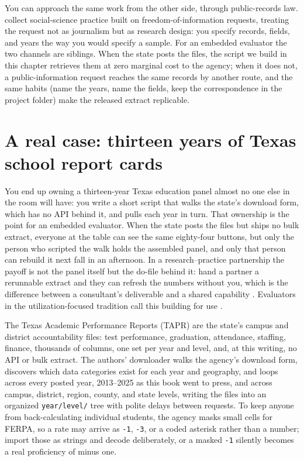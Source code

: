 You can approach the same work from the other side, through public-records law. \textcite{walby2019foi} collect social-science practice built on freedom-of-information requests, treating the request not as journalism but as research design: you specify records, fields, and years the way you would specify a sample. For an embedded evaluator the two channels are siblings. When the state posts the files, the script we build in this chapter retrieves them at zero marginal cost to the agency; when it does not, a public-information request reaches the same records by another route, and the same habits (name the years, name the fields, keep the correspondence in the project folder) make the released extract replicable.

\section{A real case: thirteen years of Texas school report cards}
You end up owning a thirteen-year Texas education panel almost no one else in the room will have: you write a short script that walks the state's download form, which has no API behind it, and pulls each year in turn. That ownership is the point for an embedded evaluator. When the state posts the files but ships no bulk extract, everyone at the table can see the same eighty-four buttons, but only the person who scripted the walk holds the assembled panel, and only that person can rebuild it next fall in an afternoon. In a research--practice partnership the payoff is not the panel itself but the do-file behind it: hand a partner a rerunnable extract and they can refresh the numbers without you, which is the difference between a consultant's deliverable and a shared capability \parencite{coburn2016partnerships}. Evaluators in the utilization-focused tradition call this building for use \parencite{patton2008utilization}.

The Texas Academic Performance Reports (TAPR) are the state's campus and district accountability files: test performance, graduation, attendance, staffing, finance, thousands of columns, one set per year and level, and, at this writing, no API or bulk extract. The authors' downloader walks the agency's download form, discovers which data categories exist for each year and geography, and loops across every posted year, 2013--2025 as this book went to press, and across campus, district, region, county, and state levels, writing the files into an organized \texttt{year/level/} tree with polite delays between requests. To keep anyone from back-calculating individual students, the agency masks small cells for FERPA, so a rate may arrive as \texttt{-1}, \texttt{-3}, or a coded asterisk rather than a number; import those as strings and decode deliberately, or a masked \texttt{-1} silently becomes a real proficiency of minus one.


